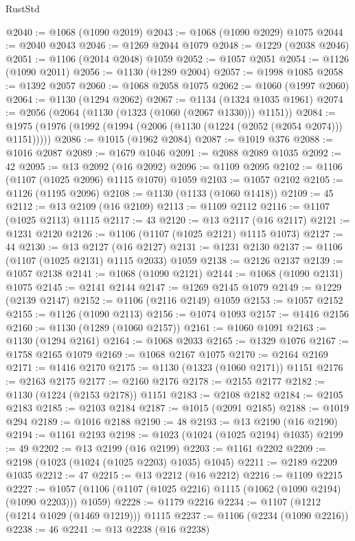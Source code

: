 \begin{lexlean}{RustStd}
\begin{coremodule}
@2040 := @1068 (@1090 @2019)
@2043 := @1068 (@1090 @2029) @1075
@2044 := @2040 @2043
@2046 := @1269 @2044 @1079
@2048 := @1229 (@2038 @2046)
@2051 := @1106 (@2014 @2048) @1059
@2052 := @1057 @2051
@2054 := @1126 (@1090 @2011)
@2056 := @1130 (@1289 @2004)
@2057 := @1998 @1085
@2058 := @1392 @2057
@2060 := @1068 @2058 @1075
@2062 := @1060 (@1997 @2060)
@2064 := @1130 (@1294 @2062)
@2067 := @1134 (@1324 @1035 @1961)
@2074 := @2056 (@2064 (@1130 (@1323 (@1060 (@2067 @1330))) @1151))
@2084 := @1975 (@1976 (@1992 (@1994 (@2006 (@1130 (@1224 (@2052 (@2054 @2074))) @1151)))))
@2086 := @1015 (@1962 @2084)
@2087 := @1019 @376
@2088 := @1016 @2087
@2089 := @1679 @1046
@2091 := @2088 @2089 @1035
@2092 := 42
@2095 := @13 @2092 (@16 @2092)
@2096 := @1109 @2095
@2102 := @1106 (@1107 (@1025 @2096) @1115 @1070) @1059
@2103 := @1057 @2102
@2105 := @1126 (@1195 @2096)
@2108 := @1130 (@1133 (@1060 @1418))
@2109 := 45
@2112 := @13 @2109 (@16 @2109)
@2113 := @1109 @2112
@2116 := @1107 (@1025 @2113) @1115
@2117 := 43
@2120 := @13 @2117 (@16 @2117)
@2121 := @1231 @2120
@2126 := @1106 (@1107 (@1025 @2121) @1115 @1073)
@2127 := 44
@2130 := @13 @2127 (@16 @2127)
@2131 := @1231 @2130
@2137 := @1106 (@1107 (@1025 @2131) @1115 @2033) @1059
@2138 := @2126 @2137
@2139 := @1057 @2138
@2141 := @1068 (@1090 @2121)
@2144 := @1068 (@1090 @2131) @1075
@2145 := @2141 @2144
@2147 := @1269 @2145 @1079
@2149 := @1229 (@2139 @2147)
@2152 := @1106 (@2116 @2149) @1059
@2153 := @1057 @2152
@2155 := @1126 (@1090 @2113)
@2156 := @1074 @1093
@2157 := @1416 @2156
@2160 := @1130 (@1289 (@1060 @2157))
@2161 := @1060 @1091
@2163 := @1130 (@1294 @2161)
@2164 := @1068 @2033
@2165 := @1329 @1076
@2167 := @1758 @2165 @1079
@2169 := @1068 @2167 @1075
@2170 := @2164 @2169
@2171 := @1416 @2170
@2175 := @1130 (@1323 (@1060 @2171)) @1151
@2176 := @2163 @2175
@2177 := @2160 @2176
@2178 := @2155 @2177
@2182 := @1130 (@1224 (@2153 @2178)) @1151
@2183 := @2108 @2182
@2184 := @2105 @2183
@2185 := @2103 @2184
@2187 := @1015 (@2091 @2185)
@2188 := @1019 @294
@2189 := @1016 @2188
@2190 := 48
@2193 := @13 @2190 (@16 @2190)
@2194 := @1161 @2193
@2198 := @1023 (@1024 (@1025 @2194) @1035)
@2199 := 49
@2202 := @13 @2199 (@16 @2199)
@2203 := @1161 @2202
@2209 := @2198 (@1023 (@1024 (@1025 @2203) @1035) @1045)
@2211 := @2189 @2209 @1035
@2212 := 47
@2215 := @13 @2212 (@16 @2212)
@2216 := @1109 @2215
@2227 := @1057 (@1106 (@1107 (@1025 @2216) @1115 (@1062 (@1090 @2194) (@1090 @2203))) @1059)
@2228 := @1179 @2216
@2234 := @1107 (@1212 (@1214 @1029 (@1469 @1219))) @1115
@2237 := @1106 (@2234 (@1090 @2216))
@2238 := 46
@2241 := @13 @2238 (@16 @2238)

\end{coremodule}
\end{lexlean}
